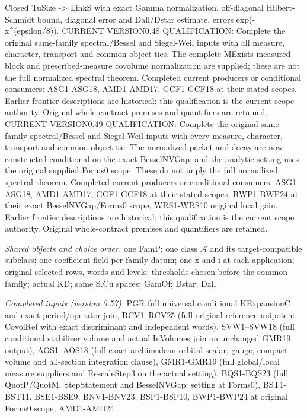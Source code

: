 Closed TuSize -> LinkS with exact Gamma normalization, off-diagonal Hilbert-Schmidt bound, diagonal error and Dall/Dstar estimate, errors exp(-x\textasciicircum{}(epsilon/8)). CURRENT VERSION0.48 QUALIFICATION: Complete the original same-family spectral/Bessel and Siegel-Weil inputs with all measure, character, transport and common-object ties. The complete MExists measured block and prescribed-measure covolume normalization are supplied; these are not the full normalized spectral theorem. Completed current producers or conditional consumers: ASG1-ASG18, AMD1-AMD17, GCF1-GCF18 at their stated scopes. Earlier frontier descriptions are historical; this qualification is the current scope authority. Original whole-contract premises and quantifiers are retained. CURRENT VERSION0.49 QUALIFICATION: Complete the original same-family spectral/Bessel and Siegel-Weil inputs with every measure, character, transport and common-object tie. The normalized packet and decay are now constructed conditional on the exact BesselNVGap, and the analytic setting uses the original supplied Forms0 scope. These do not imply the full normalized spectral theorem. Completed current producers or conditional consumers: ASG1-ASG18, AMD1-AMD17, GCF1-GCF18 at their stated scopes, BWP1-BWP24 at their exact BesselNVGap/Forms0 scope, WRS1-WRS10 original local gain. Earlier frontier descriptions are historical; this qualification is the current scope authority. Original whole-contract premises and quantifiers are retained.

\emph{Shared objects and choice order.} one FamP; one class $\mathcal A$ and its target-compatible subclass; one coefficient field per family datum; one x and i at each application; original selected rows, words and levels; thresholds chosen before the common family; actual KD; same S.Cu spaces; GamOf; Dstar; Dall

\emph{Completed inputs (version 0.57).} PGR full universal conditional KExpansionC and exact period/operator join, RCV1–RCV25 (full original reference unipotent CovolRef with exact discriminant and independent words), SVW1–SVW18 (full conditional stabilizer volume and actual InVolumes join on unchanged GMR19 output), AOS1–AOS18 (full exact archimedean orbital scalar, gauge, compact volume and all-section integration clause), GMR1-GMR19 (full global/local measure suppliers and RescaleStep3 on the actual setting), BQS1-BQS23 (full QuotP/QuotM, StepStatement and BesselNVGap; setting at Forms0), BST1-BST11, BSE1-BSE9, BNV1-BNV23, BSP1-BSP10, BWP1-BWP24 at original Forms0 scope, AMD1-AMD24

